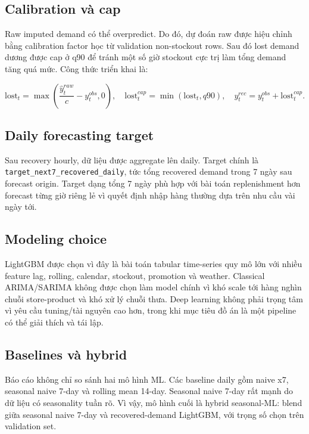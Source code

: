 \subsection{Calibration và cap}

Raw imputed demand có thể overpredict. Do đó, dự đoán raw được hiệu chỉnh bằng calibration factor học từ validation non-stockout rows. Sau đó lost demand dương được cap ở q90 để tránh một số giờ stockout cực trị làm tổng demand tăng quá mức. Công thức triển khai là:

\[
\text{lost}_t = \max\left(\frac{\hat{y}^{raw}_t}{c} - y^{obs}_t, 0\right),
\quad
\text{lost}^{cap}_t = \min(\text{lost}_t, q90),
\quad
y^{rec}_t = y^{obs}_t + \text{lost}^{cap}_t.
\]

\subsection{Daily forecasting target}

Sau recovery hourly, dữ liệu được aggregate lên daily. Target chính là \texttt{target\_next7\_recovered\_daily}, tức tổng recovered demand trong 7 ngày sau forecast origin. Target dạng tổng 7 ngày phù hợp với bài toán replenishment hơn forecast từng giờ riêng lẻ vì quyết định nhập hàng thường dựa trên nhu cầu vài ngày tới.

\subsection{Modeling choice}

LightGBM được chọn vì đây là bài toán tabular time-series quy mô lớn với nhiều feature lag, rolling, calendar, stockout, promotion và weather. Classical ARIMA/SARIMA không được chọn làm model chính vì khó scale tới hàng nghìn chuỗi store-product và khó xử lý chuỗi thưa. Deep learning không phải trọng tâm vì yêu cầu tuning/tài nguyên cao hơn, trong khi mục tiêu đồ án là một pipeline có thể giải thích và tái lập.

\subsection{Baselines và hybrid}

Báo cáo không chỉ so sánh hai mô hình ML. Các baseline daily gồm naive x7, seasonal naive 7-day và rolling mean 14-day. Seasonal naive 7-day rất mạnh do dữ liệu có seasonality tuần rõ. Vì vậy, mô hình cuối là hybrid seasonal-ML: blend giữa seasonal naive 7-day và recovered-demand LightGBM, với trọng số chọn trên validation set.
